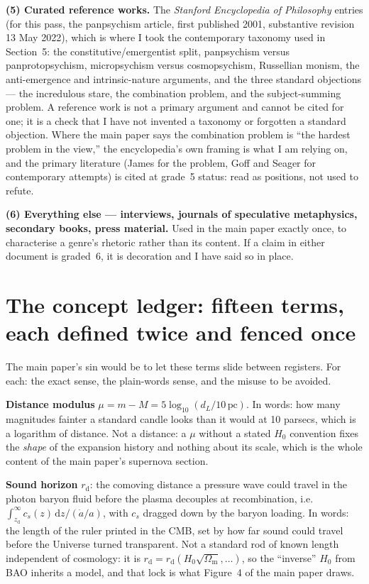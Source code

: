 \documentclass[11pt]{article}
\begin{document}
\textbf{(5) Curated reference works.} The \emph{Stanford Encyclopedia of Philosophy} entries (for this
pass, the panpsychism article, first published 2001, substantive revision 13 May 2022), which is where
I took the contemporary taxonomy used in Section~5: the constitutive/emergentist split, panpsychism
versus panprotopsychism, micropsychism versus cosmopsychism, Russellian monism, the anti-emergence and
intrinsic-nature arguments, and the three standard objections --- the incredulous stare, the combination
problem, and the subject-summing problem. A reference work is not a primary argument and cannot be cited
for one; it is a check that I have not invented a taxonomy or forgotten a standard objection. Where the
main paper says the combination problem is ``the hardest problem in the view,'' the encyclopedia's own
framing is what I am relying on, and the primary literature (James for the problem, Goff and Seager for
contemporary attempts) is cited at grade~5 status: read as positions, not used to refute.

\textbf{(6) Everything else --- interviews, journals of speculative metaphysics, secondary books,
press material.} Used in the main paper exactly once, to characterise a genre's rhetoric rather than
its content. If a claim in either document is graded~6, it is decoration and I have said so in place.

\section{The concept ledger: fifteen terms, each defined twice and fenced once}

The main paper's sin would be to let these terms slide between registers. For each: the exact sense,
the plain-words sense, and the misuse to be avoided.

\textbf{Distance modulus} $\mu = m - M = 5\log_{10}(d_L/10\,\mathrm{pc})$. In words: how many
magnitudes fainter a standard candle looks than it would at 10 parsecs, which is a logarithm of
distance. Not a distance: a $\mu$ without a stated $H_0$ convention fixes the \emph{shape} of the
expansion history and nothing about its scale, which is the whole content of the main paper's
supernova section.

\textbf{Sound horizon} $r_{\text{d}}$: the comoving distance a pressure wave could travel in the photon
baryon fluid before the plasma decouples at recombination, i.e.\ $\int_{z_{\text{d}}}^\infty c_s(z)\,
\mathrm{d}z/(\dot a/a)$, with $c_s$ dragged down by the baryon loading. In words: the length of the
ruler printed in the CMB, set by how far sound could travel before the Universe turned transparent.
Not a standard rod of known length independent of cosmology: it is $r_{\text{d}} = r_{\text{d}}(H_0\sqrt{
\Omega_{\text{m}}},\ldots)$, so the ``inverse'' $H_0$ from BAO inherits a model, and that lock is what
Figure~4 of the main paper draws.
\end{document}

